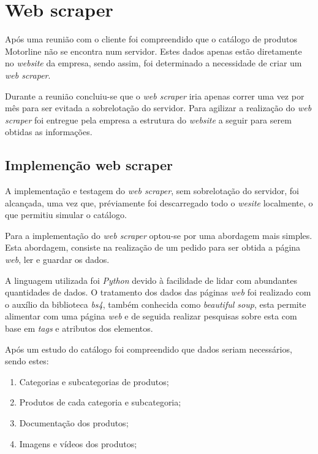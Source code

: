 

\section{Web scraper}

Após uma reunião com o cliente foi compreendido que o catálogo de produtos Motorline não se encontra num servidor. Estes dados apenas estão diretamente no \textit{website} da empresa, sendo assim, foi determinado a necessidade de criar um \textit{web scraper}.

Durante a reunião concluiu-se que o \textit{web scraper} iria apenas correr uma vez por mês para ser evitada a sobrelotação do servidor. Para agilizar a realização do \textit{web scraper} foi entregue pela empresa a estrutura do \textit{website} a seguir para serem obtidas as informações.

\subsection{Implemenção web scraper}
A implementação e testagem do \textit{web scraper}, sem sobrelotação do servidor, foi alcançada, uma vez que, préviamente foi descarregado todo o \textit{wesite} localmente, o que permitiu simular o catálogo.

Para a implementação do \textit{web scraper} optou-se por uma abordagem mais simples. Esta abordagem, consiste na realização de um pedido para ser obtida a página \textit{web}, ler e guardar os dados.

A linguagem utilizada foi \textit{Python} devido à facilidade de lidar com abundantes quantidades de dados. O tratamento dos dados das páginas \textit{web} foi realizado com o auxílio da biblioteca \textit{bs4}, também conhecida como \textit{beautiful soup}, esta permite alimentar com uma página \textit{web} e de seguida realizar pesquisas sobre esta com base em \textit{tags} e atributos dos elementos.

Após um estudo do catálogo foi compreendido que dados seriam necessários, sendo estes:
\begin{enumerate}
  \item Categorias e subcategorias de produtos;
  \item Produtos de cada categoria e subcategoria;
  \item Documentação dos produtos;
  \item Imagens e vídeos dos produtos;
\end{enumerate}

